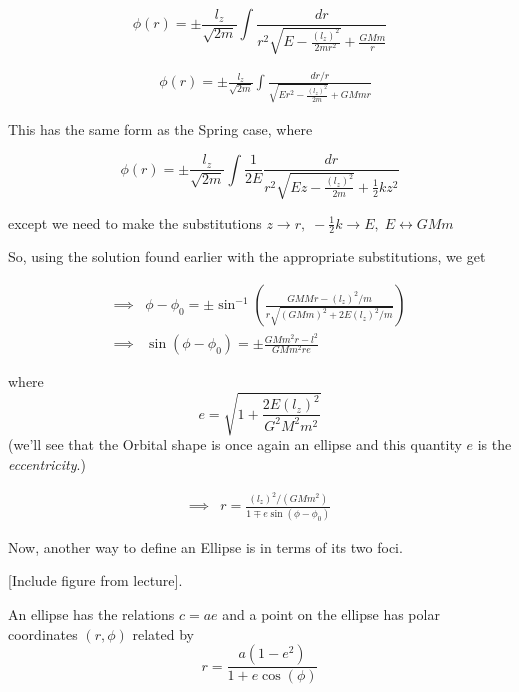 \documentclass[11pt]{article}
\begin{document}
\[  \phi(r) = \pm \frac{l_z}{\sqrt{2m}} \int \frac{dr}{r^2 \sqrt{E - \frac{(l_z)^2}{2m r^2}} + \frac{GMm}{r}}  \]

\begin{align*}
  &\phi(r) = \pm \frac{l_z}{\sqrt{2m}} \int \frac{dr/r}{\sqrt{Er^2 - \frac{(l_z)^2}{2m}} + GMmr}
\end{align*}

This has the same form as the Spring case, where

\[ \phi(r) = \pm \frac{l_z}{\sqrt{2m}} \int \frac{1}{2E} \frac{dr}{r^2 \sqrt{Ez - \frac{(l_z)^2}{2m}} + \frac{1}{2}kz^2}  \]

except we need to make the substitutions $z \rightarrow r,\; -\frac{1}{2}k \rightarrow E,\; E \leftrightarrow GMm$

So, using the solution found earlier with the appropriate substitutions, we get 

\begin{align*}
  \implies& \phi - \phi_0 = \pm \sin^{-1} \left( \frac{GMMr - (l_z)^2/m}{r \sqrt{(GMm)^2 + 2E(l_z)^2/m}} \right)  \\
  \implies& \sin(\phi - \phi_0) = \pm \frac{GM m^2 r - l^2}{GM m^2 r e}
\end{align*}

where 
\[ e = \sqrt{1 + \frac{2E(l_z)^2}{G^2 M^2 m^2}}  \]
(we'll see that the Orbital shape is once again an ellipse and this quantity $e$ is the \textit{eccentricity}.)

\begin{align*}
  \implies& r = \frac{(l_z)^2/(GMm^2)}{1 \mp e \sin(\phi - \phi_0)}
\end{align*}


\vskip 0.5cm
Now, another way to define an Ellipse is in terms of its two foci. 

\vskip 0.5cm
[Include figure from lecture].

\vskip 0.5cm
An ellipse has the relations $c = ae$ and a point on the ellipse has polar coordinates $(r, \phi)$ related by 
\[ r = \frac{a(1-e^2)}{1+e\cos(\phi)} \]
\end{document}
